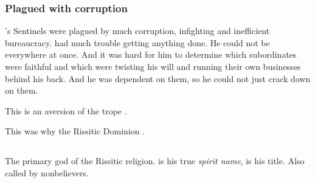 




\subsubsection{Plagued with corruption}
\Secherdamon's Sentinels were plagued by much corruption, infighting and inefficient bureaucracy. 
\Secherdamon had much trouble getting anything done. 
He could not be everywhere at once. 
And it was hard for him to determine which subordinates were faithful and which were twisting his will and running their own businesses behind his back. 
And he was dependent on them, so he could not just crack down on them. 

This is an aversion of the trope .

This was why the Rissitic Dominion .









\subsection{\HriistN} 
\index{\HriistN}
The primary god of the Rissitic religion. 
\quo{\Hriist} is his true \emph{spirit name}, \quo{\Nechsain} is his title. 
Also called  by nonbelievers. 

